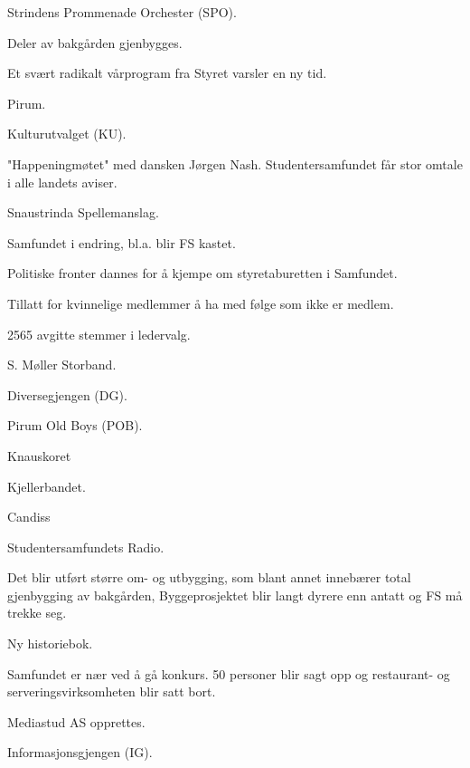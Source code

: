   \item Strindens Prommenade Orchester (SPO).
  \item Deler av bakgården gjenbygges.
\yearend 

  \item Et svært radikalt vårprogram fra Styret varsler en ny tid.
  \item Pirum.
\yearend 

  \item Kulturutvalget (KU). 
\yearend 

  \item "Happeningmøtet" med dansken Jørgen Nash. Studentersamfundet får stor omtale i alle landets aviser.
  \item Snaustrinda Spellemanslag.
\yearend 

  \item Samfundet i endring, bl.a. blir FS kastet.
  \item Politiske fronter dannes for å kjempe om styretaburetten i Samfundet. 
\yearend 

  \item Tillatt for kvinnelige medlemmer å ha med følge som ikke er medlem.
\yearend 

  \item 2565 avgitte stemmer i ledervalg.
  \item S. Møller Storband.
\yearend 

  \item Diversegjengen (DG).
\yearend 

  \item Pirum Old Boys (POB).
  \item Knauskoret
  \item Kjellerbandet.
\yearend 

  \item Candiss
\yearend 

  \item Studentersamfundets Radio.
\yearend 

  \item Det blir utført større om- og utbygging, som blant annet innebærer total gjenbygging av bakgården,
Byggeprosjektet blir langt dyrere enn antatt og FS må trekke seg.
  \item Ny historiebok.
\yearend 

  \item Samfundet er nær ved å gå konkurs. 50 personer blir sagt opp og restaurant- og serveringsvirksomheten blir satt
bort.
  \item Mediastud AS opprettes.
  \item Informasjonsgjengen (IG). 
\yearend 

